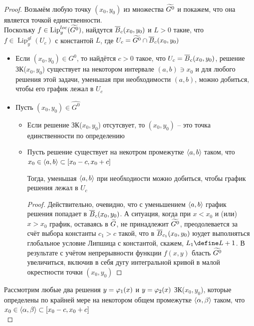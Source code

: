 \begin{proof}
    Возьмём любую точку $ (x_0, y_0) $ из множества $ \widetilde{G^0} $ и покажем, что она является точкой единственности. \\
    Поскольку $ f \in \operatorname{Lip}_y^{loc}(\widetilde{G^0}) $, найдутся $ \overline{B}_c(x_0, y_0) $ и $ L > 0 $ такие, что $ f \in \operatorname{Lip}_y^{gl}(U_c) $ с константой $ L $, где $ U_c = \widetilde{G^0} \cap \overline{B}_c(x_0, y_0) $
    \begin{itemize}
        \item Если $ (x_0, y_0) \in G^0 $, то найдётся $ c > 0 $ такое, что $ U_c = \overline{B}_c(x_0, y_0) $, решение ЗК($ x_0, y_0 $) существует на некотором интервале $ (a, b) \ni x_0 $ и для любого решения этой задачи, уменьшая при необходимости $ (a, b) $, можно добиться, чтобы его график лежал в $ U_c $
        \item Пусть $ (x_0, y_0) \in \hat{G^0} $
        \begin{itemize}
            \item Если решение ЗК($ x_0, y_0 $) отсутсвует, то $ (x_0, y_0) $ -- это точка единственности по определению
            \item Пусть решение существует на некотром промежутке $ \Braket{a, b} $ таком, что $ x_0 \in \Braket{a, b} \subset [x_0 - c, x_0 + c] $
            \begin{statement}
                Тогда, уменьшая $ \Braket{a, b} $ при необходиости можно добиться, чтобы график решения лежал в $ U_c $
            \end{statement}
            \begin{proof}
                Действительно, очевидно, что с уменьшением $ \Braket{a, b} $ график решения попадает в $ \overline{B}_c(x_0, y_0) $. А ситуация, когда при $ x < x_0 $ и (или) $ x > x_0 $ график, оставаясь в $ \widetilde{G} $, не принадлежит $ \widetilde{G^0} $, преодолевается за счёт выбора константы $ c_1 > c $ такой, что в $ \overline{B}_{c_1}(x_0, y_0) $ юудет выполняться глобальное условие Липшица с константой, скажем, $ L_1 \define L + 1 $. В результате с учётом непрерывности функции $ f(x, y) $ бласть $ \widetilde{G^0} $ увеличиться, включив в себя дугу интегральной кривой в малой окрестности точки $ (x_0, y_0) $
            \end{proof}
        \end{itemize}
    \end{itemize}
    Рассмотрим любые два решения $ y = \varphi_1(x) $ и $ y = \varphi_2(x) $ ЗК($ x_0, y_0 $), которые определены по крайней мере на некотором общем промежутке $ \Braket{\alpha, \beta} $ таком, что $ x_0 \in \Braket{\alpha, \beta} \subset [x_0 - c, x_0 + c] $ \\

\end{proof}
